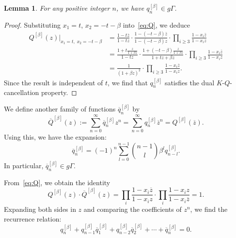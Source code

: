 \documentclass[dvipdfmx]{amsart}
\newtheorem{lemma}[thm]{Lemma}
\theoremstyle{definition}
\theoremstyle{remark}
\begin{document}
\begin{lemma}
For any positive integer \( n \), we have \( q_n^{[\beta]} \in g\Gamma \).
\end{lemma}

\begin{proof}
Substituting \( x_1 = t \), \( x_2 = -t - \beta \) into~\eqref{eq:Q}, we deduce
\[
\begin{aligned}
Q^{[\beta]}(z)\big|_{x_1 = t,\; x_2 = -t - \beta}
&=
\frac{1 - t \overline{z}}{1 - t z} \cdot
\frac{1 - (-t - \beta) \overline{z}}{1 - (-t - \beta) z} \cdot
\prod_{i \geq 3} \frac{1 - x_i \overline{z}}{1 - x_i z} \\
&=
\frac{1 + t \frac{z}{1 + \beta z}}{1 - t z} \cdot
\frac{1 + (-t - \beta) \frac{z}{1 + \beta z}}{1 + t z + \beta z} \cdot
\prod_{i \geq 3} \frac{1 - x_i \overline{z}}{1 - x_i z} \\
&=
\frac{1}{(1 + \beta z)^2} \cdot
\prod_{i \geq 3} \frac{1 - x_i \overline{z}}{1 - x_i z}.
\end{aligned}
\]
Since the result is independent of \( t \), we find that \( q_n^{[\beta]} \) satisfies the dual \( K \)-\( Q \)-cancellation property.
\end{proof}

We define another family of functions \( \overline{q}_n^{[\beta]} \) by
\[
\overline{Q}^{[\beta]}(z) := \sum_{n=0}^\infty \overline{q}_n^{[\beta]} z^n
= \sum_{n=0}^\infty q_n^{[\beta]} \overline{z}^n
= Q^{[\beta]}(\overline{z}).
\]
Using this, we have the expansion:
\begin{equation}\label{eq:qb_to_overqb}
\overline{q}_n^{[\beta]} = (-1)^n \sum_{l=0}^{n-1} \binom{n-1}{l} \beta^l q_{n - l}^{[\beta]}.
\end{equation}
In particular, \( \overline{q}_n^{[\beta]} \in g\Gamma \).

From~\eqref{eq:Q}, we obtain the identity
\begin{equation}\label{eq:QoverQ}
Q^{[\beta]}(z) \cdot \overline{Q}^{[\beta]}(z) =
\prod_i \frac{1 - x_i \overline{z}}{1 - x_i z} \cdot 
\prod_i \frac{1 - x_i z}{1 - x_i \overline{z}} = 1.
\end{equation}
Expanding both sides in \( z \) and comparing the coefficients of \( z^n \), we find the recurrence relation:
\begin{equation}\label{eq:base_relation}
q_n^{[\beta]} + q_{n-1}^{[\beta]} \overline{q}_1^{[\beta]} + 
q_{n-2}^{[\beta]} \overline{q}_2^{[\beta]} + \cdots + 
\overline{q}_n^{[\beta]} = 0.
\end{equation}
\end{document}
